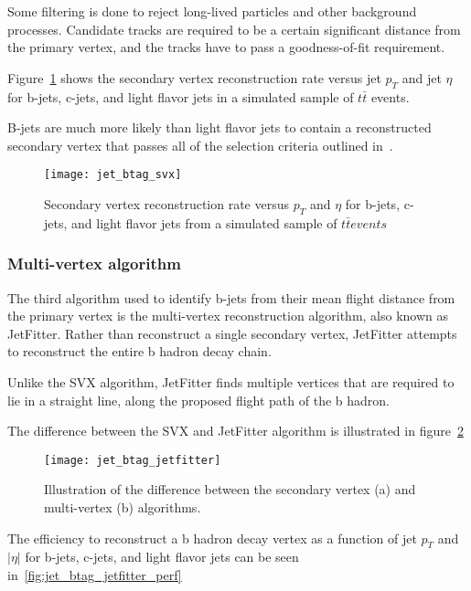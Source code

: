 Some filtering is done to reject long-lived particles and other background processes.
Candidate tracks are required to be a certain significant distance from the primary vertex, and the tracks
have to pass a goodness-of-fit requirement.

Figure~\ref{fig:jet_btag_svx} shows the secondary vertex reconstruction rate versus jet $p_T$ and jet $\eta$ for
b-jets, c-jets, and light flavor jets in a simulated sample of $t\bar{t}$ events.

B-jets are much more likely than light flavor jets to contain a reconstructed secondary vertex that passes all of
the selection criteria outlined in~\cite{jet-bjet-opt}.

\begin{figure}[!ht]
    \centering
\texttt{[image: jet\_btag\_svx]}
\caption{Secondary vertex reconstruction rate versus $p_T$ and $\eta$ for b-jets, c-jets, and light flavor jets
from a simulated sample of $t\bar{t} events$}
\label{fig:jet_btag_svx}
\end{figure}\cite{jet-bjet-opt}

\subsubsection{Multi-vertex algorithm}\label{subsubsec:jet_btag_jetfitter}

The third algorithm used to identify b-jets from their mean flight distance from the primary vertex is the
multi-vertex reconstruction algorithm, also known as JetFitter.
Rather than reconstruct a single secondary vertex, JetFitter attempts to reconstruct the entire
b hadron decay chain.\cite{jet-btag-jetfitter}

Unlike the SVX algorithm, JetFitter finds multiple vertices that are required to lie in a straight line,
along the proposed flight path of the b hadron.

The difference between the SVX and JetFitter algorithm is illustrated in figure~\ref{fig:jet_btag_jetfitter}

\begin{figure}[!ht]
    \centering
\texttt{[image: jet\_btag\_jetfitter]}
\caption{Illustration of the difference between the secondary vertex (a) and multi-vertex (b) algorithms.}
\label{fig:jet_btag_jetfitter}
\end{figure}\cite{jet-btag-jetfitter}

The efficiency to reconstruct a b hadron decay vertex as a function of jet $p_T$ and $|\eta|$ for b-jets,
c-jets, and light flavor jets can be seen in~\ref{fig:jet_btag_jetfitter_perf}

